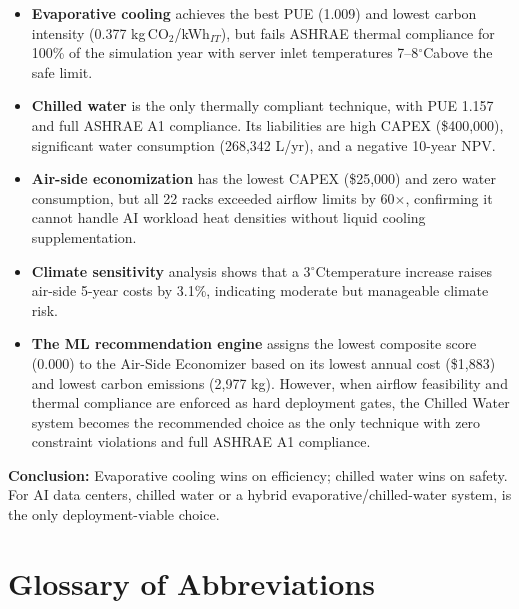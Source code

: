 ﻿\documentclass[12pt,a4paper]{report}
\newcommand{\degC}{$^{\circ}$C}
\begin{document}
\begin{itemize}[leftmargin=*, itemsep=4pt]
  \item \textbf{Evaporative cooling} achieves the best PUE (1.009) and lowest carbon
        intensity (0.377 kg\,CO$_2$/kWh$_{IT}$), but fails ASHRAE thermal compliance for
        100\% of the simulation year with server inlet temperatures 7--8\degC above the
        safe limit.

  \item \textbf{Chilled water} is the only thermally compliant technique, with PUE 1.157
        and full ASHRAE A1 compliance. Its liabilities are high CAPEX (\$400{,}000),
        significant water consumption (268{,}342 L/yr), and a negative 10-year NPV.

  \item \textbf{Air-side economization} has the lowest CAPEX (\$25{,}000) and zero water
        consumption, but all 22 racks exceeded airflow limits by 60$\times$, confirming
        it cannot handle AI workload heat densities without liquid cooling supplementation.

  \item \textbf{Climate sensitivity} analysis shows that a 3\degC temperature increase
        raises air-side 5-year costs by 3.1\%, indicating moderate but manageable
        climate risk.

  \item \textbf{The ML recommendation engine} assigns the lowest composite score (0.000)
        to the Air-Side Economizer based on its lowest annual cost (\$1{,}883) and lowest
        carbon emissions (2{,}977 kg). However, when airflow feasibility and thermal
        compliance are enforced as hard deployment gates, the Chilled Water system becomes
        the recommended choice as the only technique with zero constraint violations and
        full ASHRAE A1 compliance.
\end{itemize}

\noindent\textbf{Conclusion:} Evaporative cooling wins on efficiency; chilled water wins on
safety. For AI data centers, chilled water or a hybrid evaporative/chilled-water
system, is the only deployment-viable choice.

\newpage
\section*{Glossary of Abbreviations}
\end{document}
